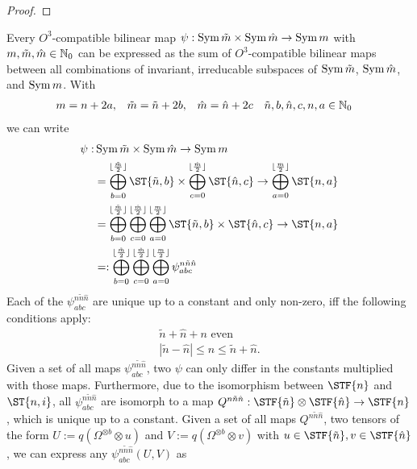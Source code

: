 {\begin{proof}
\end{proof}
\begin{lemma}\label{lem:bilinearMapDecomp}
	Every $O^3$-compatible bilinear map $\psi: \operatorname{Sym}{\tilde{m}}\times\operatorname{Sym}{\hat{m}}\to\operatorname{Sym}{m}$ with $m,\tilde{m},\hat{m}\in\mathbb{N}_0$  can be expressed as the sum of $O^3$-compatible bilinear maps between all combinations of invariant, irreducable subspaces of $\operatorname{Sym}{\tilde{m}}$, $\operatorname{Sym}{\hat{m}}$, and $\operatorname{Sym}{m}$. With
	\begin{align*}
		m&=n+2a, & \tilde{m}&=\tilde{n}+2b, & \hat{m} &= \hat{n} +2c & 	\tilde{n},b,\hat{n},c,n,a &\in \mathbb{N}_0
	\end{align*}
	we can write
	\begin{align*}
		\psi: &\Sym{\tilde{m}}\times\Sym{\hat{m}}\to\Sym{m}
		\\
		& = \bigoplus_{b=0}^{\lfloor\frac{\tilde{m}}{2}\rfloor}\ST{\tilde{n},b} \times \bigoplus_{c=0}^{\lfloor\frac{\hat{m}}{2}\rfloor}\ST{\hat{n},c} \to \bigoplus_{a=0}^{\lfloor\frac{m}{2}\rfloor}\ST{n,a}
		\\
		&=
		\bigoplus_{b=0}^{\lfloor\frac{\tilde{m}}{2}\rfloor} \bigoplus_{c=0}^{\lfloor\frac{\hat{m}}{2}\rfloor}
		\bigoplus_{a=0}^{\lfloor\frac{m}{2}\rfloor}
		\ST{\tilde{n},b} \times \ST{\hat{n},c} \to \ST{n,a}\\
		&=:\bigoplus_{b=0}^{\lfloor\frac{\tilde{m}}{2}\rfloor} \bigoplus_{c=0}^{\lfloor\frac{\hat{m}}{2}\rfloor}
		\bigoplus_{a=0}^{\lfloor\frac{m}{2}\rfloor} \psi_{abc}^{n\tilde{n}\hat{n}}
	\end{align*}
	Each of the $\psi_{abc}^{n\tilde{n}\hat{n}}$ are unique up to a constant and only non-zero, iff the following conditions apply:
	\begin{align*}
		\tilde{n}+\hat{n} + n \text{ even}\\
		|\tilde{n}-\hat{n}|\leq n\leq \tilde{n}+\hat{n}.
	\end{align*}
	Given a set of all maps $\psi_{abc}^{n\tilde{n}\hat{n}}$, two $\psi$ can only differ in the constants multiplied with those maps. Furthermore, due to the isomorphism between $\STF{n}$ and $\ST{n,i}$, all $\psi_{abc}^{n\tilde{n}\hat{n}}$  are isomorph to a map $Q^{n\tilde{n}\hat{n}}: \STF{\tilde{n}}\otimes\STF{\hat{n}}\to\STF{n}$, which is unique up to a constant. 
	Given a set of all maps $Q^{n\tilde{n}\hat{n}}$, two tensors of the form $U:=q\left(\Omega^{\otimes b}\otimes u\right)$ and $V:=q\left(\Omega^{\otimes b}\otimes v\right)$ with $u\in\STF{\tilde{n}},v\in\STF{\hat{n}}$, we can express any $\psi_{abc}^{n\tilde{n}\hat{n}}(U,V)$ as
	

\end{lemma}}
